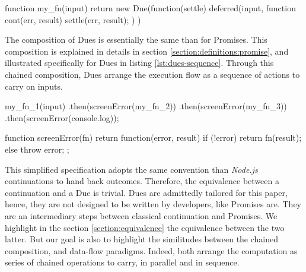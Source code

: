 
\begin{code}[js, %
             caption={Creation of a due}, %
             label={lst:due-creation}] %
function my_fn(input) {
  return new Due(function(settle) {
    deferred(input, function cont(err, result) {
      settle(err, result);
    })
  })
}
\end{code}

The composition of Dues is essentially the same than for Promises.
This composition is explained in details in section \ref{section:definitions:promise}, and illustrated specifically for Dues in listing \ref{lst:dues-sequence}.
Through this chained composition, Dues arrange the execution flow as a sequence of actions to carry on inputs.

\begin{code}[js, %
             caption={Dues are chained like Promises}, %
             label={lst:dues-sequence}] %
my_fn_1(input)
.then(screenError(my_fn_2))
.then(screenError(my_fn_3))
.then(screenError(console.log));

function screenError(fn) {
  return function(error, result) {
    if (!error) {
      return fn(result);
    } else {
      throw error;
    }
  };
}
\end{code}

This simplified specification adopts the same convention than \textit{Node.js} continuations to hand back outcomes.
Therefore, the equivalence between a continuation and a Due is trivial.
Dues are admittedly tailored for this paper, hence, they are not designed to be written by developers, like Promises are.
They are an intermediary steps between classical continuation and Promises.
We highlight in the section \ref{section:equivalence} the equivalence between the two latter.
But our goal is also to highlight the similitudes between the chained composition, and data-flow paradigms.
Indeed, both arrange the computation as series of chained operations to carry, in parallel and in sequence.


